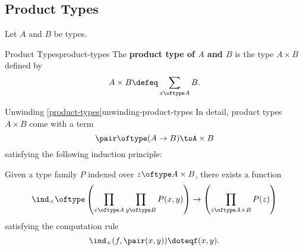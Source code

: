 \subsection{Product Types}\label{subsection-product-types}
Let $A$ and $B$ be types.
\begin{definition}{Product Types}{product-types}%
    The \textbf{product type of $A$ and $B$} is the type $A\times B$ defined by
    \[
        A\times B%
        \defeq%
        \sum_{x\oftype A}B.%
    \]%
\end{definition}
\begin{remark}{Unwinding \cref{product-types}}{unwinding-product-types}%
    In detail, product types $A\times B$ come with a term
    \[
        \pair%
        \oftype%
        (A\to B)%
        \to%
        A\times B%
    \]%
    satisfying the following induction principle:
    \begin{itemize}
        \itemstar Given a type family $P$ indexed over $z\oftype A\times B$, there exists a function
            \[
                \ind_{\mathord{\times}}%
                \oftype%
                \left(\prod_{x\oftype A}\prod_{y\oftype B}P(x,y)\right)%
                \to%
                \left(\prod_{z\oftype A\times B}P(z)\right)%
            \]%
            satisfying the computation rule
            \[
                \ind_{\mathord{\times}}(f,\pair(x,y))%
                \doteq%
                f(x,y).
            \]%
    \end{itemize}
\end{remark}

